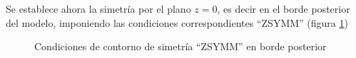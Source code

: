 \documentclass[spanish,a4paper,12pt]{article}
\begin{document}
Se establece ahora la simetría por el plano $z=0$, es decir en el borde posterior del modelo, imponiendo las condiciones correspondientes ``ZSYMM''
(figura \ref{fig:zsymm})
\begin{figure}[h!tp]
\centering
{}
\caption{Condiciones de contorno de simetría ``ZSYMM'' en borde posterior}
\label{fig:zsymm}
\end{figure}
\end{document}
